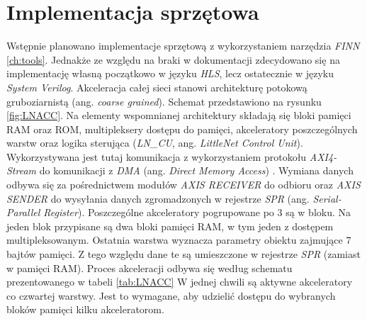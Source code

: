 \section{Implementacja sprzętowa}
Wstępnie planowano implementacje sprzętową z wykorzystaniem narzędzia \emph{FINN} \ref{ch:tools}.
Jednakże ze względu na braki w dokumentacji zdecydowano się na implementację własną początkowo w języku \emph{HLS}, lecz ostatecznie w języku \emph{System Verilog}.
Akceleracja całej sieci stanowi architekturę potokową gruboziarnistą (ang. \emph{coarse grained}).
Schemat przedstawiono na rysunku \ref{fig:LNACC}.
Na elementy wspomnianej architektury składają się bloki pamięci RAM oraz ROM, multipleksery dostępu do pamięci, akceleratory poszczególnych warstw oraz logika sterująca (\emph{LN\_CU}, ang. \emph{LittleNet Control Unit}).
Wykorzystywana jest tutaj komunikacja z wykorzystaniem protokołu \emph{AXI4-Stream} \cite{axis} do komunikacji z \emph{DMA} (ang. \emph{Direct Memory Access}) \cite{dma}.
Wymiana danych odbywa się za pośrednictwem  modułów \emph{AXIS RECEIVER} do odbioru oraz \emph{AXIS SENDER} do wysyłania danych zgromadzonych w rejestrze \emph{SPR} (ang. \emph{Serial-Parallel Register}).
Poszczególne akceleratory pogrupowane po 3 są w bloku. 
Na jeden blok przypisane są dwa bloki pamięci RAM, w tym jeden z dostępem  multipleksowanym.
Ostatnia warstwa wyznacza parametry obiektu zajmujące 7 bajtów pamięci.
Z tego względu dane te są umieszczone w rejestrze \emph{SPR} (zamiast w pamięci RAM).
Proces akceleracji odbywa się według schematu prezentowanego w tabeli \ref{tab:LNACC}
W jednej chwili są aktywne akceleratory co czwartej warstwy.
Jest to wymagane, aby udzielić dostępu do wybranych bloków pamięci kilku akceleratorom.
